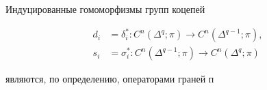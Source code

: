 \documentclass[10pt]{article}
\begin{document}
Индуцированные гомоморфизмы групп коцепей



\[

\begin{aligned}

d_{i} & =\delta_{i}^{*}: C^{n}\left(\Delta^{q} ; \pi\right) \longrightarrow C^{n}\left(\Delta^{q-1} ; \pi\right), \\

s_{i} & =\sigma_{i}^{*}: C^{n}\left(\Delta^{q-1} ; \pi\right) \longrightarrow C^{n}\left(\Delta^{q} ; \pi\right)

\end{aligned}

\]



являются, по определению, операторами граней п
\end{document}
